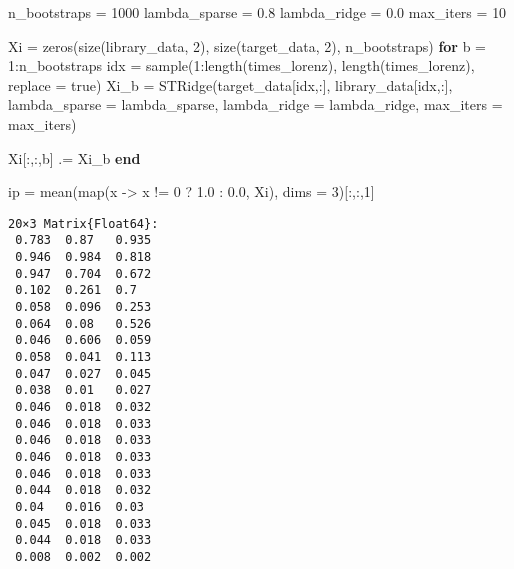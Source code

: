 \documentclass[
]{article}
\newenvironment{Shaded}{\begin{snugshade}}{\end{snugshade}}
\newcommand{\ConstantTok}[1]{\textcolor[rgb]{0.56,0.35,0.01}{#1}}
\newcommand{\ControlFlowTok}[1]{\textcolor[rgb]{0.00,0.23,0.31}{\textbf{#1}}}
\newcommand{\FloatTok}[1]{\textcolor[rgb]{0.68,0.00,0.00}{#1}}
\newcommand{\FunctionTok}[1]{\textcolor[rgb]{0.28,0.35,0.67}{#1}}
\newcommand{\NormalTok}[1]{\textcolor[rgb]{0.00,0.23,0.31}{#1}}
\newcommand{\OperatorTok}[1]{\textcolor[rgb]{0.37,0.37,0.37}{#1}}
\begin{document}
\begin{Shaded}
\begin{Highlighting}[]
\NormalTok{n\_bootstraps }\OperatorTok{=} \FloatTok{1000}
\NormalTok{lambda\_sparse }\OperatorTok{=} \FloatTok{0.8}
\NormalTok{lambda\_ridge }\OperatorTok{=} \FloatTok{0.0}
\NormalTok{max\_iters }\OperatorTok{=} \FloatTok{10}

\NormalTok{Xi }\OperatorTok{=} \FunctionTok{zeros}\NormalTok{(}\FunctionTok{size}\NormalTok{(library\_data, }\FloatTok{2}\NormalTok{), }\FunctionTok{size}\NormalTok{(target\_data, }\FloatTok{2}\NormalTok{), n\_bootstraps)}
\ControlFlowTok{for}\NormalTok{ b }\OperatorTok{=} \FloatTok{1}\OperatorTok{:}\NormalTok{n\_bootstraps}
\NormalTok{    idx }\OperatorTok{=} \FunctionTok{sample}\NormalTok{(}\FloatTok{1}\OperatorTok{:}\FunctionTok{length}\NormalTok{(times\_lorenz), }\FunctionTok{length}\NormalTok{(times\_lorenz), replace }\OperatorTok{=} \ConstantTok{true}\NormalTok{)}
\NormalTok{    Xi\_b }\OperatorTok{=} \FunctionTok{STRidge}\NormalTok{(target\_data[idx,}\OperatorTok{:}\NormalTok{], library\_data[idx,}\OperatorTok{:}\NormalTok{], }
\NormalTok{        lambda\_sparse }\OperatorTok{=}\NormalTok{ lambda\_sparse,}
\NormalTok{        lambda\_ridge }\OperatorTok{=}\NormalTok{ lambda\_ridge,}
\NormalTok{        max\_iters }\OperatorTok{=}\NormalTok{ max\_iters)}

\NormalTok{    Xi[}\OperatorTok{:}\NormalTok{,}\OperatorTok{:}\NormalTok{,b] }\OperatorTok{.=}\NormalTok{ Xi\_b}
\ControlFlowTok{end}

\NormalTok{ip }\OperatorTok{=} \FunctionTok{mean}\NormalTok{(}\FunctionTok{map}\NormalTok{(x }\OperatorTok{{-}\textgreater{}}\NormalTok{ x }\OperatorTok{!=} \FloatTok{0}\NormalTok{ ? }\FloatTok{1.0} \OperatorTok{:} \FloatTok{0.0}\NormalTok{, Xi), dims }\OperatorTok{=} \FloatTok{3}\NormalTok{)[}\OperatorTok{:}\NormalTok{,}\OperatorTok{:}\NormalTok{,}\FloatTok{1}\NormalTok{]}
\end{Highlighting}
\end{Shaded}

\begin{verbatim}
20×3 Matrix{Float64}:
 0.783  0.87   0.935
 0.946  0.984  0.818
 0.947  0.704  0.672
 0.102  0.261  0.7
 0.058  0.096  0.253
 0.064  0.08   0.526
 0.046  0.606  0.059
 0.058  0.041  0.113
 0.047  0.027  0.045
 0.038  0.01   0.027
 0.046  0.018  0.032
 0.046  0.018  0.033
 0.046  0.018  0.033
 0.046  0.018  0.033
 0.046  0.018  0.033
 0.044  0.018  0.032
 0.04   0.016  0.03
 0.045  0.018  0.033
 0.044  0.018  0.033
 0.008  0.002  0.002
\end{verbatim}
\end{document}
